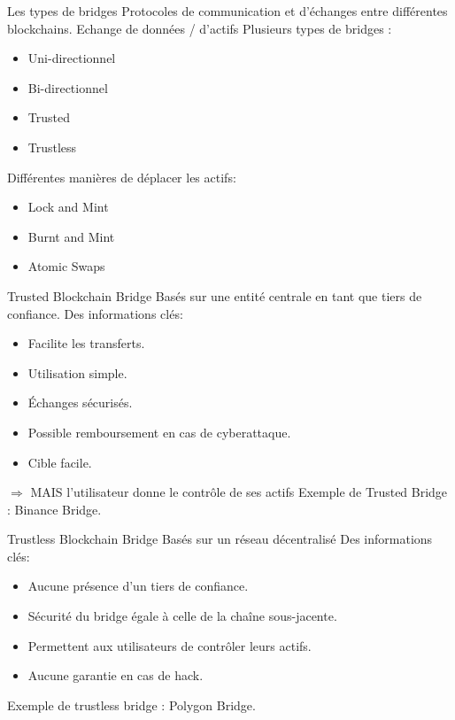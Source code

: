 \begin{frame}{Les types de bridges}
 Protocoles de communication et d'échanges entre différentes blockchains.
 Echange de données / d'actifs \newline \newline
 Plusieurs types de bridges :
 \begin{itemize}
     \item Uni-directionnel
     \item Bi-directionnel 
     \item Trusted
     \item Trustless
 \end{itemize} 
 Différentes manières de déplacer les actifs:
 \begin{itemize}
     \item Lock and Mint
     \item Burnt and Mint
     \item Atomic Swaps
 \end{itemize}
\end{frame}

\begin{frame}{Trusted Blockchain Bridge}
    Basés sur une entité centrale en tant que tiers de confiance.
Des informations clés: 
    \begin{itemize}
        \item Facilite les transferts.
        \item Utilisation simple.
        \item Échanges sécurisés.
        \item Possible remboursement en cas de cyberattaque.
        \item Cible facile.
    \end{itemize}
    $\Rightarrow$ MAIS l'utilisateur donne le contrôle de ses actifs 
Exemple de Trusted Bridge : Binance Bridge.
\end{frame}

\begin{frame}{Trustless Blockchain Bridge}
Basés sur un réseau décentralisé 
Des informations clés: 
\begin{itemize}
    \item Aucune présence d'un tiers de confiance.
    \item Sécurité du bridge égale à celle de la chaîne sous-jacente.
    \item Permettent aux utilisateurs de contrôler leurs actifs.
    \item Aucune garantie en cas de hack.
\end{itemize}
Exemple de trustless bridge : Polygon Bridge.
\end{frame}

